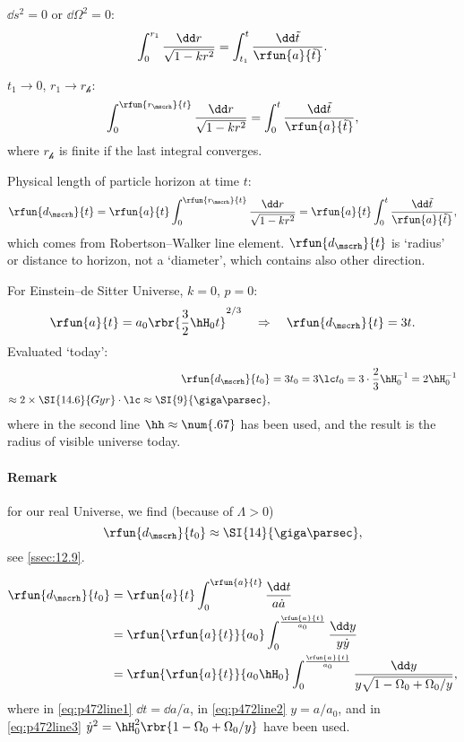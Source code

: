 $\dd s^2 = 0$ or $\dd \Omega^2 = 0$:
\begin{equation}
\int_0^{r_1} \frac{\dd r}{\sqrt{1-kr^2}} = \int_{t_1}^t \frac{\dd\tilde{t}}%
{\rfun{a}{\tilde{t}}}.
\label{eq:int-event-horizon}
\end{equation}

$t_1 \to 0$, $r_1 \to r_\mscrh$:
\begin{equation}
\int_0^{\rfun{r_\mscrh}{t}} \frac{\dd r}{\sqrt{1-kr^2}} = \int_0^t 
\frac{\dd\tilde{t}}{\rfun{a}{\tilde{t}}},
\end{equation}
where $r_\mscrh$ is finite if the last integral converges.

Physical length of particle horizon at time $t$:
\begin{equation}
\rfun{d_\mscrh}{t} = \rfun{a}{t}\int_0^{\rfun{r_\mscrh}{t}} \frac{\dd 
r}{\sqrt{1-kr^2}} = \rfun{a}{t}\int_0^t \frac{\dd 
\tilde{t}}{\rfun{a}{\tilde{t}}},
\end{equation}
which comes from Robertson--Walker line element. $\rfun{d_\mscrh}{t}$ is 
`radius' or distance to horizon, not a `diameter', which contains also other 
direction.

For Einstein--de Sitter Universe, $k = 0$, $p = 0$:
\begin{equation}
\rfun{a}{t} = a_0 \rbr{\frac{3}{2}\hH_0 t}^{2/3}\quad\Rightarrow\quad
\rfun{d_\mscrh}{t} = 3t.
\label{eq:p471above}
\end{equation}
Evaluated `today':
\begin{align}
\rfun{d_\mscrh}{t_0} &= 3t_0 = 3\lc t_0 = 3\cdot\frac{2}{3}\hH_0^{-1} = 
2\hH_0^{-1} \nonumber \\
\approx 2\times \SI{14.6}{Gyr}\cdot\lc \approx \SI{9}{\giga\parsec},
\end{align}
where in the second line $\hh \approx \num{.67}$ has been used, and the result 
is the radius of visible universe today.

\paragraph{Remark} for our real Universe, we find (because of $\Lambda > 0$)
\begin{equation}
\rfun{d_\mscrh}{t_0} \approx \SI{14}{\giga\parsec},
\end{equation}
see \cref{ssec:12.9}.

\begin{align}
\rfun{d_\mscrh}{t_0}
&= \rfun{a}{t} \int_0^{\rfun{a}{t}} \frac{\dd t}{a\dot{a}}
\label{eq:p472line1} \\
&= \rfun{\rfun{a}{t}}{a_0} \int_0^{\frac{\rfun{a}{t}}{a_0}}
\frac{\dd y}{y\dot{y}} \label{eq:p472line2} \\
&= \rfun{\rfun{a}{t}}{a_0\hH_0} \int_0^{\frac{\rfun{a}{t}}{a_0}}
\frac{\dd y}{y\sqrt{1-\Omega_0+\Omega_0/y}}, \label{eq:p472line3} \\
\end{align}
where in \cref{eq:p472line1} $\dd t = \dd a/\dot{a}$, in \cref{eq:p472line2} $y 
= a/a_0$, and in \cref{eq:p472line3} $\dot{y}^2 = \hH_0^2 \rbr{1 - \Omega_0 + 
\Omega_0/y}$ have been used.

